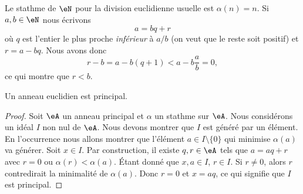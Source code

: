 \begin{example} \label{ExwqlCwvV}
    Le stathme de \( \eN\) pour la division euclidienne usuelle est \( \alpha(n)=n\). Si \( a,b\in \eN\) nous écrivons
    \begin{equation}
        a=bq+r
    \end{equation}
    où \( q\) est l'entier le plus proche \emph{inférieur} à \( a/b\) (on veut que le reste soit positif) et \( r=a-bq\). Nous avons donc
    \begin{equation}
        r-b=a-b(q+1)<a-b\frac{ a }{ b }=0,
    \end{equation}
    ce qui montre que \( r<b\).
\end{example}

\begin{proposition}\label{Propkllxnv}
    Un anneau euclidien est principal.
\end{proposition}

\begin{proof}
    Soit \( \eA\) un anneau principal et \( \alpha\) un stathme sur \( \eA\). Nous considérons un idéal \( I\) non nul de \( \eA\). Nous devons montrer que \( I\) est généré par un élément. En l'occurrence nous allons montrer que l'élément \( a\in I\setminus\{ 0 \}\) qui minimise \( \alpha(a)\) va générer. Soit \( x\in I\). Par construction, il existe \( q,r\in \eA\) tels que \( a=aq+r\) avec \( r=0\) ou \( \alpha(r)<\alpha(a)\). Étant donné que \( x,a\in I\), \( r\in I\). Si \( r\neq 0\), alors \( r\) contredirait la minimalité de \( \alpha(a)\). Donc \( r=0\) et \( x=aq\), ce qui signifie que \( I\) est principal.
\end{proof}

